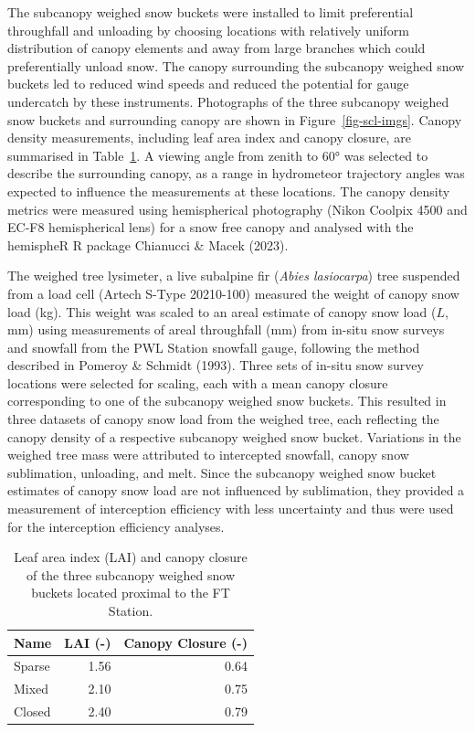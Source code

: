 \documentclass[
  letterpaper,
]{tex/uofsthesis-cs}
\begin{document}
The subcanopy weighed snow buckets were installed to limit preferential
throughfall and unloading by choosing locations with relatively uniform
distribution of canopy elements and away from large branches which could
preferentially unload snow. The canopy surrounding the subcanopy weighed
snow buckets led to reduced wind speeds and reduced the potential for
gauge undercatch by these instruments. Photographs of the three
subcanopy weighed snow buckets and surrounding canopy are shown in
Figure~\ref{fig-scl-imgs}. Canopy density measurements, including leaf
area index and canopy closure, are summarised in
Table~\ref{tbl-scl-lai-cc}. A viewing angle from zenith to 60° was
selected to describe the surrounding canopy, as a range in hydrometeor
trajectory angles was expected to influence the measurements at these
locations. The canopy density metrics were measured using hemispherical
photography (Nikon Coolpix 4500 and EC-F8 hemispherical lens) for a snow
free canopy and analysed with the hemispheR R package Chianucci \& Macek
(2023).

The weighed tree lysimeter, a live subalpine fir (\emph{Abies
lasiocarpa}) tree suspended from a load cell (Artech S-Type 20210-100)
measured the weight of canopy snow load (kg). This weight was scaled to
an areal estimate of canopy snow load (\(L\), mm) using measurements of
areal throughfall (mm) from in-situ snow surveys and snowfall from the
PWL Station snowfall gauge, following the method described in Pomeroy \&
Schmidt (1993). Three sets of in-situ snow survey locations were
selected for scaling, each with a mean canopy closure corresponding to
one of the subcanopy weighed snow buckets. This resulted in three
datasets of canopy snow load from the weighed tree, each reflecting the
canopy density of a respective subcanopy weighed snow bucket. Variations
in the weighed tree mass were attributed to intercepted snowfall, canopy
snow sublimation, unloading, and melt. Since the subcanopy weighed snow
bucket estimates of canopy snow load are not influenced by sublimation,
they provided a measurement of interception efficiency with less
uncertainty and thus were used for the interception efficiency analyses.

\begin{longtable}[]{@{}lrr@{}}

\caption{\label{tbl-scl-lai-cc}Leaf area index (LAI) and canopy closure
of the three subcanopy weighed snow buckets located proximal to the FT
Station.}

\tabularnewline

\toprule\noalign{}
Name & LAI (-) & Canopy Closure (-) \\
\midrule\noalign{}
\endhead
\bottomrule\noalign{}
\endlastfoot
Sparse & 1.56 & 0.64 \\
Mixed & 2.10 & 0.75 \\
Closed & 2.40 & 0.79 \\

\end{longtable}
\end{document}
